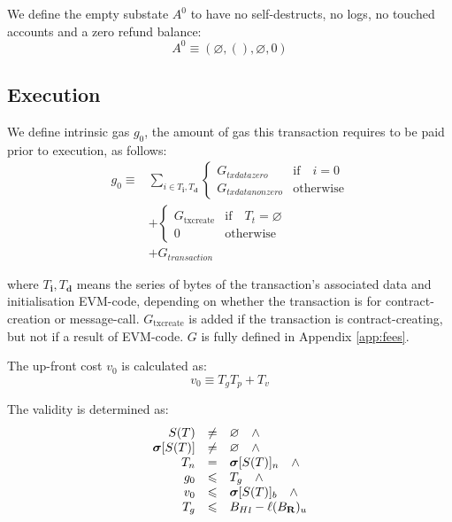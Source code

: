 \documentclass[9pt,oneside]{amsart}
\begin{document}
\begin{multicols}{2}
We define the empty substate $A^0$ to have no self-destructs, no logs, no touched accounts and a zero refund balance:
\begin{equation}
A^0 \equiv (\varnothing, (), \varnothing, 0)
\end{equation}

\subsection{Execution}
We define intrinsic gas $g_0$, the amount of gas this transaction requires to be paid prior to execution, as follows:
\begin{align}
g_0 \equiv {} & \sum_{i \in T_\mathbf{i}, T_\mathbf{d}} \begin{cases} G_{txdatazero} & \text{if} \quad i = 0 \\ G_{txdatanonzero} & \text{otherwise} \end{cases} \\
{} & + \begin{cases} G_\text{txcreate} & \text{if} \quad T_t = \varnothing \\ 0 & \text{otherwise} \end{cases} \\
{} & + G_{transaction}
\end{align}

where $T_\mathbf{i},T_\mathbf{d}$ means the series of bytes of the transaction's associated data and initialisation EVM-code, depending on whether the transaction is for contract-creation or message-call. $G_\text{txcreate}$ is added if the transaction is contract-creating, but not if a result of EVM-code. $G$ is fully defined in Appendix \ref{app:fees}.

The up-front cost $v_0$ is calculated as:
\begin{equation}
v_0 \equiv T_g T_p + T_v
\end{equation}

The validity is determined as:
\begin{equation}
\begin{array}[t]{rcl}
S(T) & \neq & \varnothing \quad \wedge \\
\boldsymbol{\sigma}[S(T)] & \neq & \varnothing \quad \wedge \\
T_n & = & \boldsymbol{\sigma}[S(T)]_n \quad \wedge \\
g_0 & \leqslant & T_g \quad \wedge \\
v_0 & \leqslant & \boldsymbol{\sigma}[S(T)]_b \quad \wedge \\
T_g & \leqslant & {B_H}_l - \ell(B_\mathbf{R})_u
\end{array}
\end{equation}


\end{multicols}
\end{document}
